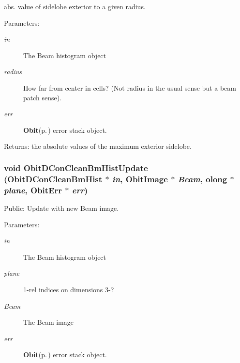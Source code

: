 abs. value of sidelobe exterior to a given radius. \begin{Desc}
\item[Parameters:]
\begin{description}
\item[{\em in}]The Beam histogram object \item[{\em radius}]How far from center in cells? (Not radius in the usual sense but a beam patch sense). \item[{\em err}]{\bf Obit}{\rm (p.\,\pageref{structObit})} error stack object. \end{description}
\end{Desc}
\begin{Desc}
\item[Returns:]the absolute values of the maximum exterior sidelobe. \end{Desc}
\subsubsection{\setlength{\rightskip}{0pt plus 5cm}void Obit\-DCon\-Clean\-Bm\-Hist\-Update ({\bf Obit\-DCon\-Clean\-Bm\-Hist} $\ast$ {\em in}, {\bf Obit\-Image} $\ast$ {\em Beam}, {\bf olong} $\ast$ {\em plane}, {\bf Obit\-Err} $\ast$ {\em err})}\label{ObitDConCleanBmHist_8c_a11}


Public: Update with new Beam image. 

\begin{Desc}
\item[Parameters:]
\begin{description}
\item[{\em in}]The Beam histogram object \item[{\em plane}]1-rel indices on dimensions 3-? \item[{\em Beam}]The Beam image \item[{\em err}]{\bf Obit}{\rm (p.\,\pageref{structObit})} error stack object. \end{description}
\end{Desc}
